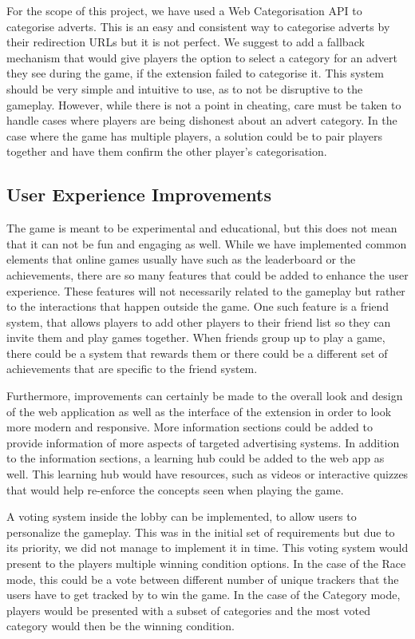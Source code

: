 \documentclass{l4proj}
\begin{document}
For the scope of this project, we have used a Web Categorisation API to categorise adverts. This is an easy and consistent way to categorise adverts by their redirection URLs but it is not perfect. We suggest to add a fallback mechanism that would give players the option to select a category for an advert they see during the game, if the extension failed to categorise it. This system should be very simple and intuitive to use, as to not be disruptive to the gameplay. However, while there is not a point in cheating, care must be taken to handle cases where players are being dishonest about an advert category. In the case where the game has multiple players, a solution could be to pair players together and have them confirm the other player's categorisation.

\subsection{User Experience Improvements}
The game is meant to be experimental and educational, but this does not mean that it can not be fun and engaging as well. While we have implemented common elements that online games usually have such as the leaderboard or the achievements, there are so many features that could be added to enhance the user experience. These features will not necessarily related to the gameplay but rather to the interactions that happen outside the game. One such feature is a friend system, that allows players to add other players to their friend list so they can invite them and play games together. When friends group up to play a game, there could be a system that rewards them or there could be a different set of achievements that are specific to the friend system. 

Furthermore, improvements can certainly be made to the overall look and design of the web application as well as the interface of the extension in order to look more modern and responsive.
More information sections could be added to provide information of more aspects of targeted advertising systems. In addition to the information sections, a learning hub could be added to the web app as well. This learning hub would have resources, such as videos or interactive quizzes that would help re-enforce the concepts seen when playing the game.

A voting system inside the lobby can be implemented, to allow users to personalize the gameplay. This was in the initial set of requirements but due to its priority, we did not manage to implement it in time. This voting system would present to the players multiple winning condition options. In the case of the Race mode, this could be a vote between different number of unique trackers that the users have to get tracked by to win the game. In the case of the Category mode, players would be presented with a subset of categories and the most voted category would then be the winning condition.
\end{document}
